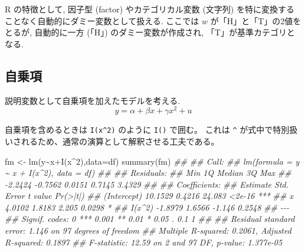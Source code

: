 \documentclass[
  letterpaper,
  xelatex,
  ja=standard, xelatex]{bxjsbook}
\newenvironment{Shaded}{\begin{snugshade}}{\end{snugshade}}
\newcommand{\AttributeTok}[1]{\textcolor[rgb]{0.40,0.45,0.13}{#1}}
\newcommand{\DecValTok}[1]{\textcolor[rgb]{0.68,0.00,0.00}{#1}}
\newcommand{\DocumentationTok}[1]{\textcolor[rgb]{0.37,0.37,0.37}{\textit{#1}}}
\newcommand{\FunctionTok}[1]{\textcolor[rgb]{0.28,0.35,0.67}{#1}}
\newcommand{\NormalTok}[1]{\textcolor[rgb]{0.00,0.23,0.31}{#1}}
\newcommand{\OtherTok}[1]{\textcolor[rgb]{0.00,0.23,0.31}{#1}}
\newcommand{\SpecialCharTok}[1]{\textcolor[rgb]{0.37,0.37,0.37}{#1}}
\begin{document}
R の特徴として, 因子型 (factor) やカテゴリカル変数 (文字列)
を特に変換することなく自動的にダミー変数として扱える. ここでは \(w\)
が「H」と「T」の2値をとるが, 自動的に一方 (「H」)
のダミー変数が作成され, 「T」が基準カテゴリとなる.

\subsection{自乗項}\label{ux81eaux4e57ux9805}

説明変数として自乗項を加えたモデルを考える. \[
y = \alpha + \beta x + \gamma x^2 + u
\]

自乗項を含めるときは \texttt{I(x\^{}2)} のように \texttt{I()} で囲む。
これは \texttt{\^{}}
が式中で特別扱いされるため、通常の演算として解釈させる工夫である。

\begin{Shaded}
\begin{Highlighting}[]
\NormalTok{fm }\OtherTok{\textless{}{-}} \FunctionTok{lm}\NormalTok{(y}\SpecialCharTok{\textasciitilde{}}\NormalTok{x}\SpecialCharTok{+}\FunctionTok{I}\NormalTok{(x}\SpecialCharTok{\^{}}\DecValTok{2}\NormalTok{),}\AttributeTok{data=}\NormalTok{df)}
\FunctionTok{summary}\NormalTok{(fm)}
\DocumentationTok{\#\# }
\DocumentationTok{\#\# Call:}
\DocumentationTok{\#\# lm(formula = y \textasciitilde{} x + I(x\^{}2), data = df)}
\DocumentationTok{\#\# }
\DocumentationTok{\#\# Residuals:}
\DocumentationTok{\#\#     Min      1Q  Median      3Q     Max }
\DocumentationTok{\#\# {-}2.2424 {-}0.7562  0.0151  0.7145  3.4329 }
\DocumentationTok{\#\# }
\DocumentationTok{\#\# Coefficients:}
\DocumentationTok{\#\#             Estimate Std. Error t value Pr(\textgreater{}|t|)    }
\DocumentationTok{\#\# (Intercept)  10.1529     0.4216  24.083   \textless{}2e{-}16 ***}
\DocumentationTok{\#\# x             4.0102     1.8183   2.205   0.0298 *  }
\DocumentationTok{\#\# I(x\^{}2)       {-}1.8979     1.6566  {-}1.146   0.2548    }
\DocumentationTok{\#\# {-}{-}{-}}
\DocumentationTok{\#\# Signif. codes:  0 \textquotesingle{}***\textquotesingle{} 0.001 \textquotesingle{}**\textquotesingle{} 0.01 \textquotesingle{}*\textquotesingle{} 0.05 \textquotesingle{}.\textquotesingle{} 0.1 \textquotesingle{} \textquotesingle{} 1}
\DocumentationTok{\#\# }
\DocumentationTok{\#\# Residual standard error: 1.146 on 97 degrees of freedom}
\DocumentationTok{\#\# Multiple R{-}squared:  0.2061, Adjusted R{-}squared:  0.1897 }
\DocumentationTok{\#\# F{-}statistic: 12.59 on 2 and 97 DF,  p{-}value: 1.377e{-}05}
\end{Highlighting}
\end{Shaded}
\end{document}
